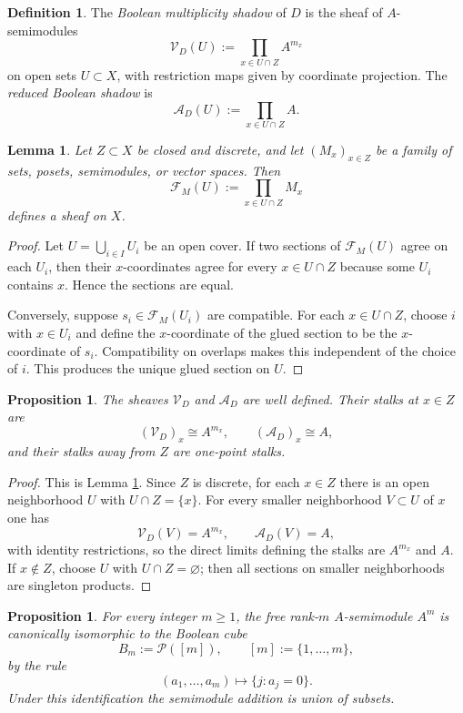 \documentclass[11pt,a4paper]{article}
\newtheorem{proposition}[theorem]{Proposition}
\newtheorem{lemma}[theorem]{Lemma}
\theoremstyle{definition}
\newtheorem{definition}[theorem]{Definition}
\theoremstyle{remark}
\newcommand{\cP}{\mathcal P}
\newcommand{\cV}{\mathcal V}
\newcommand{\cA}{\mathcal A}
\begin{document}
\begin{definition}
The \emph{Boolean multiplicity shadow} of $D$ is the sheaf of $A$-semimodules
\[
\cV_D(U):=\prod_{x\in U\cap Z}A^{m_x}
\]
on open sets $U\subset X$, with restriction maps given by coordinate projection.  The \emph{reduced Boolean shadow} is
\[
\cA_D(U):=\prod_{x\in U\cap Z}A.
\]
\end{definition}

\begin{lemma}\label{lem:product-sheaf}
Let $Z\subset X$ be closed and discrete, and let $(M_x)_{x\in Z}$ be a family of sets, posets, semimodules, or vector spaces.  Then
\[
\mathcal F_M(U):=\prod_{x\in U\cap Z}M_x
\]
defines a sheaf on $X$.
\end{lemma}

\begin{proof}
Let $U=\bigcup_{i\in I}U_i$ be an open cover.  If two sections of $\mathcal F_M(U)$ agree on each $U_i$, then their $x$-coordinates agree for every $x\in U\cap Z$ because some $U_i$ contains $x$.  Hence the sections are equal.

Conversely, suppose $s_i\in\mathcal F_M(U_i)$ are compatible.  For each $x\in U\cap Z$, choose $i$ with $x\in U_i$ and define the $x$-coordinate of the glued section to be the $x$-coordinate of $s_i$.  Compatibility on overlaps makes this independent of the choice of $i$.  This produces the unique glued section on $U$.
\end{proof}

\begin{proposition}\label{prop:shadow-stalks}
The sheaves $\cV_D$ and $\cA_D$ are well defined.  Their stalks at $x\in Z$ are
\[
(\cV_D)_x\cong A^{m_x},
\qquad
(\cA_D)_x\cong A,
\]
and their stalks away from $Z$ are one-point stalks.
\end{proposition}

\begin{proof}
This is Lemma \ref{lem:product-sheaf}.  Since $Z$ is discrete, for each $x\in Z$ there is an open neighborhood $U$ with $U\cap Z=\{x\}$.  For every smaller neighborhood $V\subset U$ of $x$ one has
\[
\cV_D(V)=A^{m_x},\qquad \cA_D(V)=A,
\]
with identity restrictions, so the direct limits defining the stalks are $A^{m_x}$ and $A$.  If $x\notin Z$, choose $U$ with $U\cap Z=\varnothing$; then all sections on smaller neighborhoods are singleton products.
\end{proof}

\begin{proposition}\label{prop:boolean-cube}
For every integer $m\ge1$, the free rank-$m$ $A$-semimodule $A^m$ is canonically isomorphic to the Boolean cube
\[
B_m:=\cP([m]),\qquad [m]:=\{1,\dots,m\},
\]
by the rule
\[
(a_1,\dots,a_m)\longmapsto \{j:a_j=0\}.
\]
Under this identification the semimodule addition is union of subsets.
\end{proposition}
\end{document}
